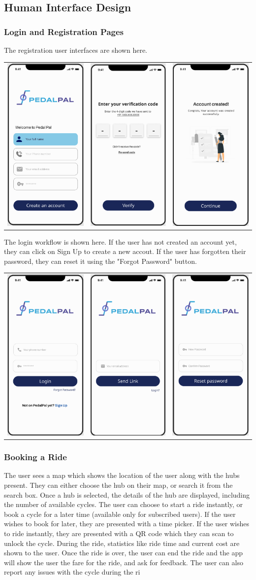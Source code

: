 \subsection{Human Interface Design}
\subsubsection{Login and Registration Pages}
The registration user interfaces are shown here.
\begin{center}
\begin{tabular}{ccc}
    \includegraphics[scale=0.1]{ui-images/Register.png} & \includegraphics[scale=0.1]{ui-images/PhoneOTP.png} &    \includegraphics[scale=0.1]{ui-images/AccountSuccess.png}
\end{tabular}
\end{center}
The login workflow is shown here. If the user has not created an account yet, they can click on Sign Up to create a new accout. If the user has forgotten their password, they can reset it using the "Forgot Password" button.
\begin{center}
\begin{tabular}{ccc}
    \includegraphics[scale=0.1]{ui-images/Login.png} & \includegraphics[scale=0.1]{ui-images/EmailOTP.png} &\includegraphics[scale=0.1]{ui-images/ResetPassword.png}
\end{tabular}
\end{center}

\subsubsection{Booking a Ride}
The user sees a map which shows the location of the user along with the hubs present. They can either choose the hub on their map, or search it from the search box. Once a hub is selected, the details of the hub are displayed, including the number of available cycles. The user can choose to start a ride instantly, or book a cycle for a later time (available only for subscribed users). If the user wishes to book for later, they are presented with a time picker. If the user wishes to ride instantly, they are presented with a QR code which they can scan to unlock the cycle. During the ride, statistics like ride time and current cost are shown to the user. Once the ride is over, the user can end the ride and the app will show the user the fare for the ride, and ask for feedback. The user can also report any issues with the cycle during the ri
